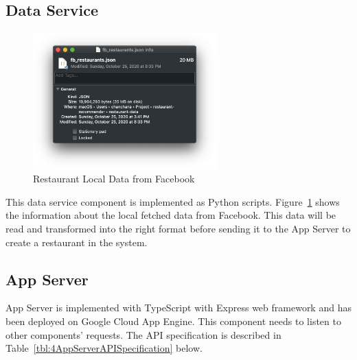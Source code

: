 \documentclass[12pt,oneside,openright,a4paper]{cpe-english-project}
\begin{document}
\subsection{Data Service}

\begin{figure}[H]\centering
\includegraphics[width=200pt]{./images/4result_dataservice.png}
\caption{Restaurant Local Data from Facebook}\label{fig:4result_dataservice}
\end{figure}

This data service component is implemented as Python scripts. Figure~\ref{fig:4result_dataservice} shows the information about the local fetched data from Facebook. This data will be read and transformed into the right format before sending it to the App Server to create a restaurant in the system.

\subsection{App Server}

App Server is implemented with TypeScript with Express web framework and has been deployed on Google Cloud App Engine. This component needs to listen to other components’ requests. The API specification is described in Table~\ref{tbl:4AppServerAPISpecification} below.
\end{document}
